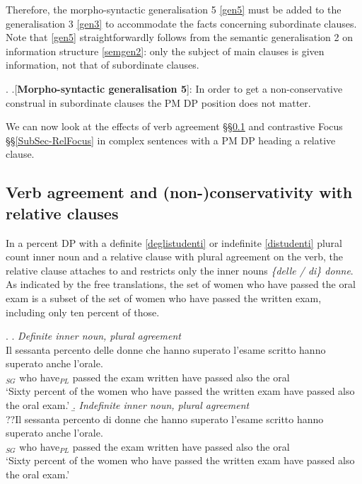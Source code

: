 \documentclass[charis, linguex]{glossa}
\begin{document}
  
Therefore, the morpho-syntactic generalisation 5 \ref{gen5} must be added to the generalisation 3 \ref{gen3} to accommodate the facts concerning subordinate clauses. Note that \ref{gen5} straightforwardly follows from the semantic generalisation 2 on information structure \ref{semgen2}: only the subject of main clauses is given information, not that of subordinate clauses. 

\ex. \label{gen5} \a.[{\bf Morpho-syntactic generalisation 5}]:  In order to get a non-conservative construal in subordinate clauses the PM DP position does not matter. 

We can now look at the effects of verb agreement \S\S\ref{SubSec-verb-sub} and contrastive Focus \S\S\ref{SubSec-RelFocus} in complex sentences with a PM DP heading a relative clause. 

\subsection{Verb agreement and (non-)conservativity with relative clauses} \label{SubSec-verb-sub}
	
In a percent DP with a definite \ref{deglistudenti} or indefinite \ref{distudenti} plural count inner noun and a relative clause with plural agreement on the verb, the relative clause attaches to and restricts only the inner nouns \textit{\{delle / di\} donne}. As indicated by the free translations, the set of women who have passed the oral exam is a subset of the set of women who have passed the written exam, including only ten percent of those. 

\ex. \a. \textit{Definite inner noun, plural agreement}	 \\  
    \gll Il sessanta percento delle donne che hanno superato l'esame scritto hanno superato anche l'orale. \\ 
       [the sixty percent {of the} women$_{PL}$]$_{SG}$ who have$_{PL}$ passed {the exam} written  have passed also {the oral} \\
	  \glt `Sixty percent of the women who have passed the written exam have passed also the oral exam.' \label{deglistudenti} 
\b. \textit{Indefinite inner noun, plural agreement}	 \\    
     \gll ??Il sessanta percento di donne che hanno superato l'esame scritto hanno superato anche l'orale. \\ 
      [the sixty percent of women$_{PL}$]$_{SG}$ who have$_{PL}$ passed {the exam} written have passed also {the oral} \\
	  \glt `Sixty percent of the women who have passed the written exam have passed also the oral exam.' \label{distudenti} 
	 
\end{document}
